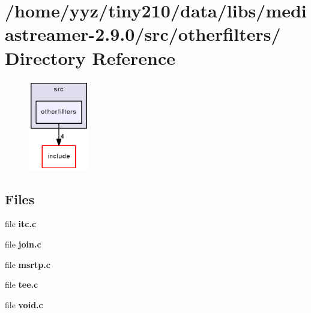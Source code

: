 \section{/home/yyz/tiny210/data/libs/mediastreamer-\/2.9.0/src/otherfilters/ Directory Reference}
\label{dir_05b7f4028528d7bf8cf5217b16d2572f}


\nopagebreak
\begin{figure}[H]
\begin{center}
\leavevmode
\includegraphics[width=75pt]{dir_05b7f4028528d7bf8cf5217b16d2572f_dep}
\end{center}
\end{figure}
\subsection*{Files}
\begin{DoxyCompactItemize}
\item 
file {\bfseries itc.c}
\item 
file {\bfseries join.c}
\item 
file {\bfseries msrtp.c}
\item 
file {\bfseries tee.c}
\item 
file {\bfseries void.c}
\end{DoxyCompactItemize}
